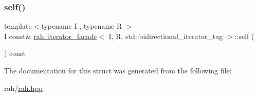 \mbox{\label{structrah_1_1iterator__facade_3_01_i_00_01_r_00_01std_1_1bidirectional__iterator__tag_01_4_ae2156f4940ef87b6852ff7abe52002c9}} 
\subsubsection{\texorpdfstring{self()}{self()}\hspace{0.1cm}{\footnotesize\ttfamily [2/2]}}
{\footnotesize\ttfamily template$<$typename I , typename R $>$ \\
I const\& \mbox{\hyperlink{structrah_1_1iterator__facade}{rah\+::iterator\+\_\+facade}}$<$ I, R, std\+::bidirectional\+\_\+iterator\+\_\+tag $>$\+::self (\begin{DoxyParamCaption}{ }\end{DoxyParamCaption}) const\hspace{0.3cm}{\ttfamily [inline]}}



The documentation for this struct was generated from the following file\+:\begin{DoxyCompactItemize}
\item 
rah/\mbox{\hyperlink{rah_8hpp}{rah.\+hpp}}\end{DoxyCompactItemize}
